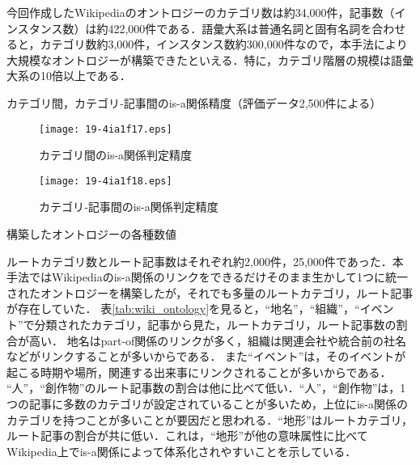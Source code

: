 \documentclass[japanese]{jnlp_1.4}
\begin{document}
今回作成したWikipediaのオントロジーのカテゴリ数は約34,000件，記事数（インスタンス数）は約422,000件である．語彙大系は普通名詞と固有名詞を合わせると，カテゴリ数約3,000件，インスタンス数約300,000件なので，本手法により大規模なオントロジーが構築できたといえる．特に，カテゴリ階層の規模は語彙大系の10倍以上である．

\begin{table}[p]
\caption{カテゴリ間，カテゴリ‐記事間のis-a関係精度（評価データ2,500件による）}
\label{tab:isa_accu}

\end{table}
\begin{figure}[p]
\begin{minipage}[t]{0.5\columnwidth}
\begin{center}
\texttt{[image: 19-4ia1f17.eps]}
\end{center}
\caption{カテゴリ間のis-a関係判定精度}
\label{fig:cate_cate_isa_accu}
\end{minipage}
\begin{minipage}[t]{0.5\columnwidth}
\begin{center}
\texttt{[image: 19-4ia1f18.eps]}
\end{center}
\caption{カテゴリ‐記事間のis-a関係判定精度}
\label{fig:cate_kizi_isa_accu}
\end{minipage}
\end{figure}

\begin{table}[t]
\caption{構築したオントロジーの各種数値}
\label{tab:wiki_ontology}

\end{table}

ルートカテゴリ数とルート記事数はそれぞれ約2,000件，25,000件であった．本手法ではWikipediaのis-a関係のリンクをできるだけそのまま生かして1つに統一されたオントロジーを構築したが，それでも多量のルートカテゴリ，ルート記事が存在していた．
表\ref{tab:wiki_ontology}を見ると，``地名''，``組織''，``イベント''で分類されたカテゴリ，記事から見た，ルートカテゴリ，ルート記事数の割合が高い．
地名はpart-of関係のリンクが多く，組織は関連会社や統合前の社名などがリンクすることが多いからである．
また``イベント''は，そのイベントが起こる時期や場所，関連する出来事にリンクされることが多いからである．
``人''，``創作物''のルート記事数の割合は他に比べて低い．``人''，``創作物''は，1つの記事に多数のカテゴリが設定されていることが多いため，上位にis-a関係のカテゴリを持つことが多いことが要因だと思われる．``地形''はルートカテゴリ，ルート記事の割合が共に低い．これは，``地形''が他の意味属性に比べてWikipedia上でis-a関係によって体系化されやすいことを示している．
\end{document}
